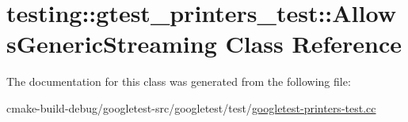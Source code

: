 \hypertarget{classtesting_1_1gtest__printers__test_1_1AllowsGenericStreaming}{}\section{testing\+::gtest\+\_\+printers\+\_\+test\+::Allows\+Generic\+Streaming Class Reference}
\label{classtesting_1_1gtest__printers__test_1_1AllowsGenericStreaming}


The documentation for this class was generated from the following file\+:\begin{DoxyCompactItemize}
\item 
cmake-\/build-\/debug/googletest-\/src/googletest/test/\mbox{\hyperlink{googletest-printers-test_8cc}{googletest-\/printers-\/test.\+cc}}\end{DoxyCompactItemize}
